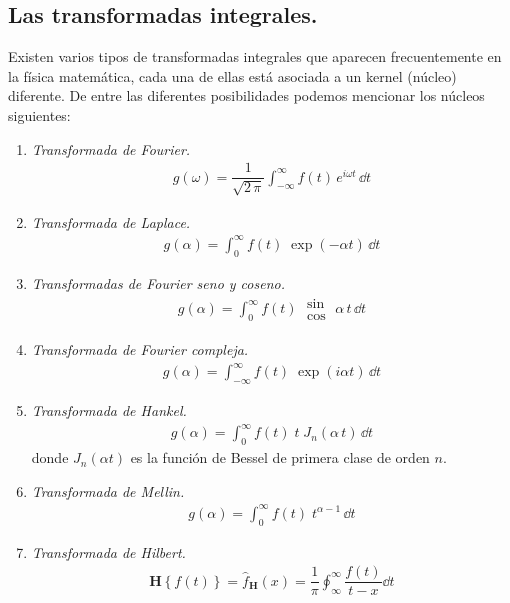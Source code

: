 \subsection{Las transformadas integrales.}

Existen varios tipos de transformadas integrales que aparecen frecuentemente en la física matemática, cada una de ellas está asociada a un kernel (núcleo) diferente. De entre las diferentes posibilidades podemos mencionar los núcleos siguientes:
\begin{enumerate}
\item \emph{Transformada de Fourier.}
\begin{align}
g (\omega) = \dfrac{1}{\sqrt{2 \, \pi}} \int_{-\infty}^{\infty} f(t) \, e^{i \omega t} \, \dd{t}
\label{eq:ecuacion_07_01}
\end{align}
\item \emph{Transformada de Laplace.}
\begin{align}
g (\alpha)= \int_{0}^{\infty} f(t) \; \exp(-\alpha t) \, \dd{t}
\label{eq:ecuacion_7_02}
\end{align}
\item \emph{Transformadas de Fourier seno y coseno.}
\begin{align}
g (\alpha)= \int_{0}^{\infty} f(t) \; \substack{ \textstyle \sin \\[0.5em] \textstyle \cos} \; \alpha \, t \,  \dd{t}
\label{eq:ecuacion_7_03}
\end{align}
\item \emph{Transformada de Fourier compleja.}
\begin{align}
g (\alpha)= \int_{-\infty}^{\infty} f(t) \; \exp(i \alpha t) \, \dd{t}
\label{eq:ecuacion_7_04}
\end{align}
\item \emph{Transformada de Hankel.}
\begin{align}
g (\alpha)= \int_{0}^{\infty} f(t) \; t \; J_{n} (\alpha \, t) \, \dd{t}
\label{eq:ecuacion_7_05}
\end{align}
donde $J_{n}(\alpha t)$ es la función de Bessel de primera clase de orden $n$.
\item \emph{Transformada de Mellin.}
\begin{align}
g (\alpha)= \int_{0}^{\infty} f(t) \; t^{\alpha-1} \, \dd{t}
\label{eq:ecuacion_7_06}
\end{align}
\item \emph{Transformada de Hilbert.}
\begin{align}
\mathbf{H} \left\{ f(t) \right\} = \hat{f}_{\mathbf{H}} (x) = \dfrac{1}{\pi} \oint_{\infty}^{\infty} \dfrac{f(t)}{t - x} \dd{t}

\end{align}
\end{enumerate}
